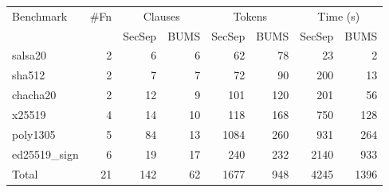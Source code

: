 \begin{tabular}{lrrrrrrr}
\toprule
Benchmark & \#Fn & \multicolumn{2}{c}{Clauses} & \multicolumn{2}{c}{Tokens} & \multicolumn{2}{c}{Time (s)}\\
 & & SecSep & BUMS & SecSep & BUMS & SecSep & BUMS\\
\midrule
salsa20 & 2 & 6 & 6 & 62 & 78 & 23 & 2\\
sha512 & 2 & 7 & 7 & 72 & 90 & 200 & 13\\
chacha20 & 2 & 12 & 9 & 101 & 120 & 201 & 56\\
x25519 & 4 & 14 & 10 & 118 & 168 & 750 & 128\\
poly1305 & 5 & 84 & 13 & 1084 & 260 & 931 & 264\\
ed25519\_sign & 6 & 19 & 17 & 240 & 232 & 2140 & 933\\
\midrule
Total & 21 & 142 & 62 & 1677 & 948 & 4245 & 1396\\
\bottomrule
\end{tabular}

